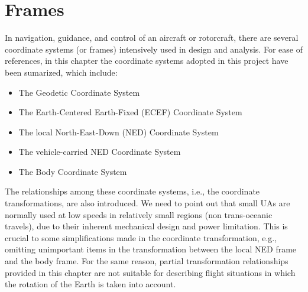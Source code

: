 \chapter{Frames}\label{ch:frames}

In navigation, guidance, and control of an aircraft or rotorcraft, there are several
coordinate systems (or frames) intensively used in design and analysis. For ease of references, in this chapter the coordinate systems adopted in this project have been sumarized, which include:

\begin{itemize}
\item{The Geodetic Coordinate System}
\item{The Earth-Centered Earth-Fixed (ECEF) Coordinate System}
\item{The local North-East-Down (NED) Coordinate System}
\item{The vehicle-carried NED Coordinate System}
\item{The Body Coordinate System}
\end{itemize}

The relationships among these coordinate systems, i.e., the coordinate transformations, are also introduced. We need to point out that small UAs are normally used at low speeds in relatively small regions (non trans-oceanic travels), due to their inherent mechanical design and power limitation. This is crucial to some simplifications made in the coordinate transformation, e.g., omitting unimportant items in the transformation between the local NED frame and the body frame. For the same reason, partial transformation relationships provided in this chapter are not suitable for describing flight situations in which the rotation of the Earth is taken into account.